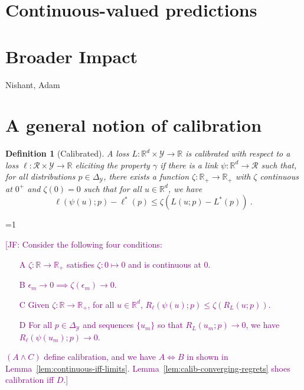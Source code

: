 \documentclass{article}
\newcommand{\Comments}{1}
\newcommand{\mynote}[2]{\ifnum\Comments=1\textcolor{#1}{#2}\fi}
\newcommand{\jessie}[1]{\mynote{purple}{[JF: #1]}}
\newcommand{\reals}{\mathbb{R}}
\newcommand{\simplex}{\Delta_\Y}
\newcommand{\R}{\mathcal{R}}
\newcommand{\Y}{\mathcal{Y}}
\newcommand{\risk}[1]{#1^*}
\newtheorem{definition}{Definition}
\begin{document}
\section{Continuous-valued predictions}\label{sec:contin-consis}



\newpage

\section*{Broader Impact}

\begin{ack}
Nishant, Adam
\end{ack}




\newpage
\appendix
\section{A general notion of calibration}

\begin{definition}[Calibrated]\label{def:calibrated-general}
	A loss $L:\reals^d \times \Y \to \reals$ is \emph{calibrated} with respect to a loss $\ell : \R \times \Y \to \reals$ eliciting the property $\gamma$ if there is a link $\psi : \reals^d \to \R$ such that, for all distributions $p \in \simplex$, there exists a function $\zeta : \reals_+ \to \reals_+$ with $\zeta$ continuous at $0^+$ and $\zeta(0) = 0$ such that for all $u \in \reals^d$, we have
	\begin{equation}\label{eq:calibrated-general}
	\ell( \psi(u); p) - \risk{\ell}(p)  \leq \zeta \left(  L(u;p) - \risk{L}(p) \right)~.~
	\end{equation}
\end{definition}

\jessie{Consider the following four conditions:
\begin{enumerate}
	\item [A] $\zeta:\reals \to \reals_+$ satisfies $\zeta : 0 \mapsto 0$ and is continuous at $0$.
	\item [B] $\epsilon_m \to 0 \implies \zeta(\epsilon_m) \to 0$.
	\item [C] Given $\zeta:\reals \to \reals_+$, for all $u \in \reals^d$, $R_\ell(\psi(u); p) \leq \zeta(R_L(u;p))$.
	\item [D] For all $p \in \simplex$ and sequences $\{u_m\}$ so that $R_L(u_m; p) \to 0$, we have $R_\ell(\psi(u_m); p) \to 0$.
\end{enumerate}
$(A \wedge C)$ define calibration, and we have $A \iff B$ in shown in Lemma~\ref{lem:continuous-iff-limits}.  Lemma~\ref{lem:calib-converging-regrets} shoes calibration iff $D$.}
\end{document}
